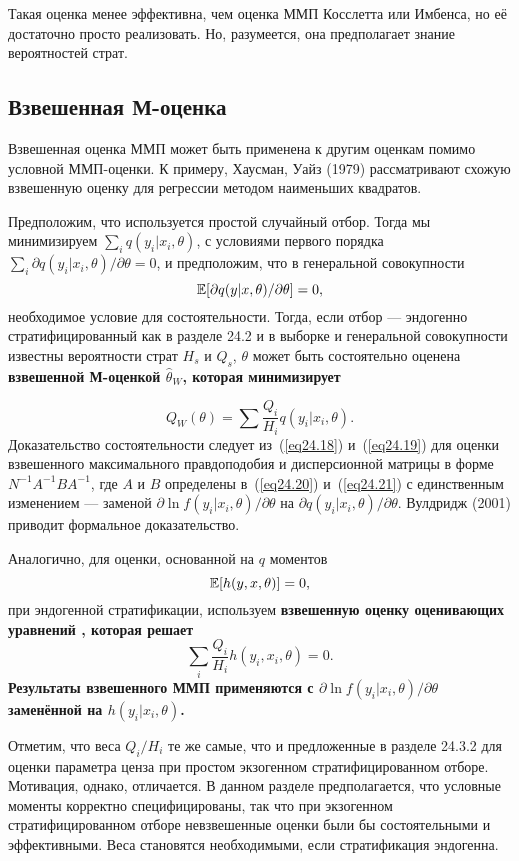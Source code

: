 Такая оценка менее эффективна, чем оценка ММП Косслетта или Имбенса, но её достаточно просто реализовать. Но, разумеется, она предполагает знание вероятностей страт. 

\subsection*{Взвешенная М-оценка}

Взвешенная оценка ММП может быть применена к другим оценкам помимо условной ММП-оценки. К примеру, Хаусман, Уайз (1979) рассматривают схожую взвешенную оценку для регрессии методом наименьших квадратов. 

Предположим, что используется простой случайный отбор. Тогда мы минимизируем $\sum_i q(y_i|x_i, \theta)$, с условиями первого порядка $\sum_i \partial q(y_i|x_i, \theta) / \partial \theta = 0$, и предположим, что в генеральной совокупности
$$
\mathbb{E}[\partial q(y|x,\theta) / \partial \theta] = 0,
$$
необходимое условие для состоятельности. Тогда, если отбор --- эндогенно стратифицированный как в разделе 24.2 и в выборке и генеральной совокупности известны вероятности страт $H_s$ и $Q_s$, $\theta$ может быть состоятельно оценена \bfseries взвешенной М-оценкой \mdseries $\hat \theta_W$, которая минимизирует

\begin{equation}
\label{eq24.22}
Q_W(\theta) = \sum \frac{Q_i}{H_i} q(y_i|x_i, \theta). 
\end{equation}
Доказательство состоятельности следует из~(\ref{eq24.18}) и~(\ref{eq24.19}) для оценки взвешенного максимального правдоподобия и дисперсионной матрицы в форме $N^{-1}A^{-1}BA^{-1}$, где $A$ и $B$ определены в~(\ref{eq24.20}) и~(\ref{eq24.21}) с единственным изменением --- заменой $\partial \ln f(y_i|x_i, \theta) / \partial \theta$ на $\partial q(y_i|x_i,\theta) / \partial \theta$. Вулдридж (2001) приводит формальное доказательство. 

Аналогично, для оценки, основанной на $q$ моментов
$$
\mathbb{E}[h(y,x,\theta)] = 0,
$$
при эндогенной стратификации, используем \bfseries взвешенную оценку оценивающих уравнений \mdseries, которая решает
$$
\sum_i \frac{Q_i}{H_i} h(y_i, x_i, \theta) = 0.
$$
Результаты взвешенного ММП применяются с $\partial \ln{f(y_i|x_i, \theta)} / \partial \theta$ заменённой на $h(y_i| x_i, \theta)$. 

Отметим, что веса $Q_i/H_i$ те же самые, что и предложенные в разделе 24.3.2 для оценки параметра ценза при простом экзогенном стратифицированном отборе. Мотивация, однако, отличается. В данном разделе предполагается, что условные моменты корректно специфицированы, так что при экзогенном стратифицированном отборе невзвешенные оценки были бы состоятельными и эффективными. Веса становятся необходимыми, если стратификация эндогенна. 

